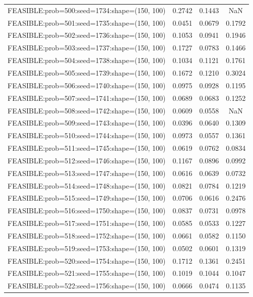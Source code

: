 \begin{longtable}{lccc}
FEASIBLE:prob=500:seed=1734:shape=(150, 100) & 0.2742 & 0.1443 &    NaN \\
FEASIBLE:prob=501:seed=1735:shape=(150, 100) & 0.0451 & 0.0679 & 0.1792 \\
FEASIBLE:prob=502:seed=1736:shape=(150, 100) & 0.1053 & 0.0941 & 0.1946 \\
FEASIBLE:prob=503:seed=1737:shape=(150, 100) & 0.1727 & 0.0783 & 0.1466 \\
FEASIBLE:prob=504:seed=1738:shape=(150, 100) & 0.1034 & 0.1121 & 0.1761 \\
FEASIBLE:prob=505:seed=1739:shape=(150, 100) & 0.1672 & 0.1210 & 0.3024 \\
FEASIBLE:prob=506:seed=1740:shape=(150, 100) & 0.0975 & 0.0928 & 0.1195 \\
FEASIBLE:prob=507:seed=1741:shape=(150, 100) & 0.0689 & 0.0683 & 0.1252 \\
FEASIBLE:prob=508:seed=1742:shape=(150, 100) & 0.0609 & 0.0558 &    NaN \\
FEASIBLE:prob=509:seed=1743:shape=(150, 100) & 0.0396 & 0.0640 & 0.1309 \\
FEASIBLE:prob=510:seed=1744:shape=(150, 100) & 0.0973 & 0.0557 & 0.1361 \\
FEASIBLE:prob=511:seed=1745:shape=(150, 100) & 0.0619 & 0.0762 & 0.0834 \\
FEASIBLE:prob=512:seed=1746:shape=(150, 100) & 0.1167 & 0.0896 & 0.0992 \\
FEASIBLE:prob=513:seed=1747:shape=(150, 100) & 0.0616 & 0.0639 & 0.0732 \\
FEASIBLE:prob=514:seed=1748:shape=(150, 100) & 0.0821 & 0.0784 & 0.1219 \\
FEASIBLE:prob=515:seed=1749:shape=(150, 100) & 0.0706 & 0.0616 & 0.2476 \\
FEASIBLE:prob=516:seed=1750:shape=(150, 100) & 0.0837 & 0.0731 & 0.0978 \\
FEASIBLE:prob=517:seed=1751:shape=(150, 100) & 0.0585 & 0.0533 & 0.1227 \\
FEASIBLE:prob=518:seed=1752:shape=(150, 100) & 0.0661 & 0.0582 & 0.1150 \\
FEASIBLE:prob=519:seed=1753:shape=(150, 100) & 0.0502 & 0.0601 & 0.1319 \\
FEASIBLE:prob=520:seed=1754:shape=(150, 100) & 0.1712 & 0.1361 & 0.2451 \\
FEASIBLE:prob=521:seed=1755:shape=(150, 100) & 0.1019 & 0.1044 & 0.1047 \\
FEASIBLE:prob=522:seed=1756:shape=(150, 100) & 0.0666 & 0.0474 & 0.1135 \\

\end{longtable}
